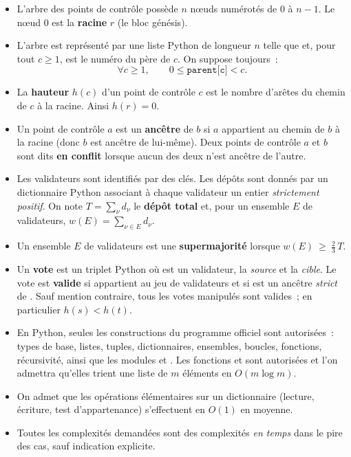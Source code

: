 \documentclass[11pt,a4paper]{article}
\begin{document}
\begin{itemize}[leftmargin=1.4em,itemsep=2pt]
\item L'arbre des points de contrôle possède $n$ n\oe uds numérotés de $0$ à $n-1$. Le
n\oe ud $0$ est la \textbf{racine} $r$ (le bloc génésis).
\item L'arbre est représenté par une liste Python  de longueur $n$ telle que
 et, pour tout $c\ge 1$,  est le numéro du père de
$c$. On suppose toujours~: \[\forall c\ge 1,\qquad 0\le \texttt{parent[c]} < c .\]
\item La \textbf{hauteur} $h(c)$ d'un point de contrôle $c$ est le nombre d'arêtes du
chemin de $c$ à la racine. Ainsi $h(r)=0$.
\item Un point de contrôle $a$ est un \textbf{ancêtre} de $b$ si $a$ appartient au chemin
de $b$ à la racine (donc $b$ est ancêtre de lui-même). Deux points de contrôle $a$ et $b$
sont dits \textbf{en conflit} lorsque aucun des deux n'est ancêtre de l'autre.
\item Les validateurs sont identifiés par des clés. Les dépôts sont donnés par un
dictionnaire Python  associant à chaque validateur un entier
\emph{strictement positif}. On note $T=\sum_{\nu} d_\nu$ le
\textbf{dépôt total} et, pour un ensemble $E$ de validateurs, $w(E)=\sum_{\nu\in E} d_\nu$.
\item Un ensemble $E$ de validateurs est une \textbf{supermajorité} lorsque
$w(E)\ \ge\ \tfrac{2}{3}\,T$.
\item Un \textbf{vote} est un triplet Python  où  est un
validateur,  la \emph{source} et  la \emph{cible}. Le vote est
\textbf{valide} si  appartient au jeu de validateurs et si  est un ancêtre
\emph{strict} de . Sauf mention contraire, tous les votes manipulés sont valides~;
en particulier $h(s)<h(t)$.
\item En Python, seules les constructions du programme officiel sont autorisées~: types de
base, listes, tuples, dictionnaires, ensembles, boucles, fonctions, récursivité, ainsi que
les modules  et . Les fonctions  et  sont
autorisées et l'on admettra qu'elles trient une liste de $m$ éléments en $O(m\log m)$.
\item On admet que les opérations élémentaires sur un dictionnaire (lecture, écriture,
test d'appartenance) s'effectuent en $O(1)$ en moyenne.
\item Toutes les complexités demandées sont des complexités \emph{en temps} dans le pire
des cas, sauf indication explicite.
\end{itemize}
\end{document}
